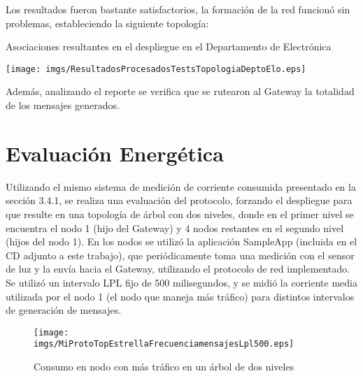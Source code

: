 Los resultados fueron bastante satisfactorios, la formación de la red funcionó sin problemas, estableciendo la siguiente topología:

\begin{table}[H]
\centering
\caption{Asociaciones resultantes en el despliegue en el Departamento de Electrónica}
 \texttt{[image: imgs/ResultadosProcesadosTestsTopologiaDeptoElo.eps]}
\end{table}
 
 Además, analizando el reporte se verifica que se rutearon al Gateway la totalidad de los mensajes generados.
 
\section{Evaluación Energética}


Utilizando el mismo sistema de medición de corriente consumida presentado en la sección 3.4.1, se realiza una evaluación del protocolo, forzando el despliegue para que resulte en una topología de árbol con dos niveles, donde en el primer nivel se encuentra el nodo 1 (hijo del Gateway) y 4 nodos restantes en el segundo nivel (hijos del nodo 1). En los nodos se utilizó la aplicación SampleApp (incluida en el CD adjunto a este trabajo), que periódicamente toma una medición con el sensor de luz y la envía hacia el Gateway, utilizando el protocolo de red implementado. Se utilizó un intervalo LPL fijo de 500 milisegundos, y se midió la corriente media utilizada por el nodo 1 (el nodo que maneja más tráfico) para distintos intervalos de generación de mensajes.

\begin{figure}[H]
 \centering
 \texttt{[image: imgs/MiProtoTopEstrellaFrecuenciamensajesLpl500.eps]}
 \caption{Consumo en nodo con más tráfico en un árbol de dos niveles}
\end{figure}

